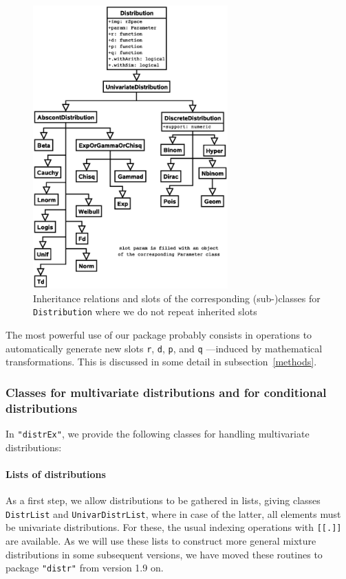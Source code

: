 \documentclass[11pt]{article}
\newcommand{\code}[1]{{\tt #1}}
\newcommand{\pkg}[1]{{\tt "#1"}}
\begin{document}
\begin{figure}[htb]\label{fig1}
  \begin{center}
    \includegraphics[viewport=130 150 500 730,width=7.5cm]{distribution.ps}%
    \caption{\label{fig1c}{\footnotesize Inheritance relations and slots of the 
    corresponding \mbox{(sub-)}classes for \code{Distribution} where we do not 
    repeat inherited slots
    }}
  \end{center}
\vspace{-1ex}
\end{figure}
\fi
The most powerful use of our package probably consists in operations to 
automatically generate new slots \code{r}, \code{d}, \code{p}, and \code{q} 
---induced by mathematical transformations. This is discussed in some detail in 
subsection~{\ref{methods}}.
%
\subsubsection{Classes for multivariate distributions and for conditional 
distributions}

In \pkg{distrEx}, we provide the following classes for handling multivariate 
distributions:

\paragraph{Lists of distributions}

As a first step, we allow distributions to be gathered in lists, giving
classes \code{DistrList} and \code{UnivarDistrList}, where in case of the latter,
all elements must be univariate distributions. For these, the usual indexing 
operations with \code{[[.]]} are available. As we will use these lists to 
construct more general mixture distributions in some subsequent versions, we 
have moved these routines to package \pkg{distr} from version 1.9 on.
\end{document}
